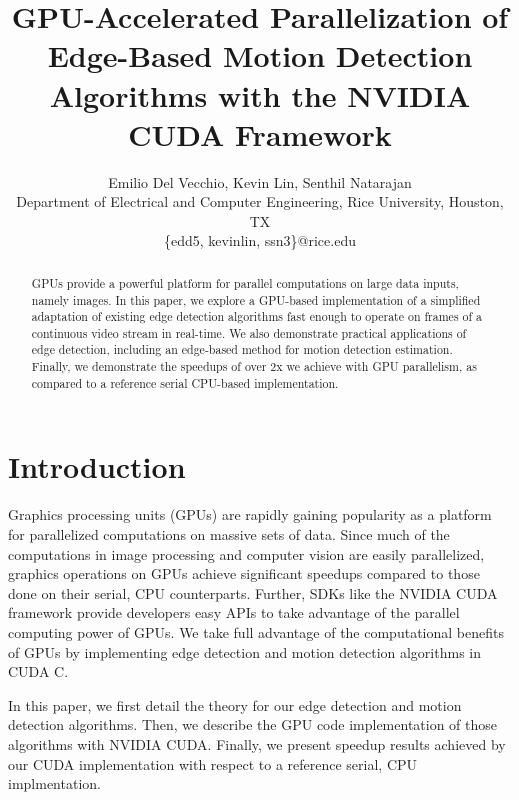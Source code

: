 \documentclass[journal]{IEEEtran}
\begin{document}
\title{GPU-Accelerated Parallelization of Edge-Based Motion Detection Algorithms with the NVIDIA CUDA Framework}

\author{
	Emilio Del Vecchio, Kevin Lin, Senthil Natarajan\\
	Department of Electrical and Computer Engineering, Rice University, Houston, TX\\
	\{edd5, kevinlin, ssn3\}@rice.edu
}

\maketitle


\begin{abstract}
GPUs provide a powerful platform for parallel computations on large data inputs, namely images. In this paper, we explore a GPU-based implementation of a simplified adaptation of existing edge detection algorithms fast enough to operate on frames of a continuous video stream in real-time. We also demonstrate practical applications of edge detection, including an edge-based method for motion detection estimation. Finally, we demonstrate the speedups of over 2x we achieve with GPU parallelism, as compared to a reference serial CPU-based implementation.
\end{abstract}


\section{Introduction}
Graphics processing units (GPUs) are rapidly gaining popularity as a platform for parallelized computations on massive sets of data. Since much of the computations in image processing and computer vision are easily parallelized, graphics operations on GPUs achieve significant speedups compared to those done on their serial, CPU counterparts. Further, SDKs like the NVIDIA CUDA framework provide developers easy APIs to take advantage of the parallel computing power of GPUs. We take full advantage of the computational benefits of GPUs by implementing edge detection and motion detection algorithms in CUDA C.
\par In this paper, we first detail the theory for our edge detection and motion detection algorithms. Then, we describe the GPU code implementation of those algorithms with NVIDIA CUDA. Finally, we present speedup results achieved by our CUDA implementation with respect to a reference serial, CPU implmentation.
\end{document}
